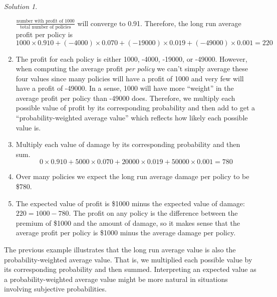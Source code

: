 \documentclass[
  letterpaper,
  DIV=11,
  numbers=noendperiod]{scrreprt}
\theoremstyle{plain}
\theoremstyle{definition}
\theoremstyle{definition}
\theoremstyle{definition}
\theoremstyle{remark}
\newtheorem{refsolution}{Solution}[chapter]
\begin{document}
\begin{tcolorbox}
\begin{refsolution}
\begin{enumerate}
  \(\frac{\text{number with profit of 1000}}{\text{total number of policies}}\)
  will converge to 0.91. Therefore, the long run average profit per
  policy is \[
  1000\times 0.910 + (-4000)\times 0.070 + (-19000) \times 0.019 + (-49000) \times 0.001 = 220
  \]
\item
  The profit for each policy is either 1000, -4000, -19000, or -49000.
  However, when computing the average profit \emph{per policy} we can't
  simply average these four values since many policies will have a
  profit of 1000 and very few will have a profit of -49000. In a sense,
  1000 will have more ``weight'' in the average profit per policy than
  -49000 does. Therefore, we multiply each possible value of profit by
  its corresponding probability and then add to get a
  ``probability-weighted average value'' which reflects how likely each
  possible value is.
\item
  Multiply each value of damage by its corresponding probability and
  then sum. \[
  0\times 0.910 + 5000\times 0.070 + 20000 \times 0.019 + 50000 \times 0.001 = 780
  \]
\item
  Over many policies we expect the long run average damage per policy to
  be \$780.
\item
  The expected value of profit is \$1000 minus the expected value of
  damage: \(220 = 1000 - 780\). The profit on any policy is the
  difference between the premium of \$1000 and the amount of damage, so
  it makes sense that the average profit per policy is \$1000 minus the
  average damage per policy.
\end{enumerate}

\label{sol-ev-insurance-2}

\end{refsolution}

\end{tcolorbox}

The previous example illustrates that the long run average value is also
the probability-weighted average value. That is, we multiplied each
possible value by its corresponding probability and then summed.
Interpreting an expected value as a probability-weighted average value
might be more natural in situations involving subjective probabilities.
\end{document}

